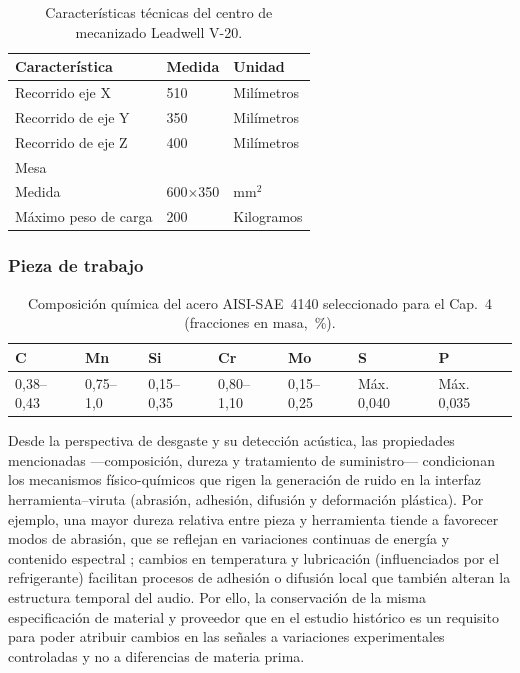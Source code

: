 \documentclass[12pt, letterpaper]{report}
\begin{document}
\begin{table}[htbp]
\centering
\small
\caption{Caracter\'{i}sticas t\'{e}cnicas del centro de mecanizado Leadwell V-20.}
\label{tab:leadwell-v20}
\begin{tabularx}{\textwidth}{X X X}
\toprule
Caracter\'{i}stica & Medida & Unidad \\
\midrule
Recorrido eje X & 510 & Mil\'{i}metros \\
Recorrido de eje Y & 350 & Mil\'{i}metros \\
Recorrido de eje Z & 400 & Mil\'{i}metros \\
Mesa &  &  \\
Medida & 600$\times$350 & mm$^2$ \\
M\'{a}ximo peso de carga & 200 & Kilogramos \\
\bottomrule
\end{tabularx}
\end{table}

\subsubsection{Pieza de trabajo}


\begin{table}[htbp]
\centering
\small
\caption{Composici\'{o}n qu\'{i}mica del acero AISI-SAE~4140 seleccionado para el Cap.~4 (fracciones en masa, \,\%).}
\label{tab:comp-4140-cap4}
\begin{tabularx}{\textwidth}{X X X X X X X}
\toprule
C & Mn & Si & Cr & Mo & S & P \\
\midrule
0{,}38--0{,}43 & 0{,}75--1{,}0 & 0{,}15--0{,}35 & 0{,}80--1{,}10 & 0{,}15--0{,}25 & M\'{a}x. 0{,}040 & M\'{a}x. 0{,}035 \\
\bottomrule
\end{tabularx}
\end{table}

Desde la perspectiva de desgaste y su detección acústica, las propiedades mencionadas ---composición, dureza y tratamiento de suministro--- condicionan los mecanismos físico-químicos que rigen la generación de ruido en la interfaz herramienta--viruta (abrasión, adhesión, difusión y deformación plástica). Por ejemplo, una mayor dureza relativa entre pieza y herramienta tiende a favorecer modos de abrasión, que se reflejan en variaciones continuas de energía y contenido espectral ; cambios en temperatura y lubricación (influenciados por el refrigerante) facilitan procesos de adhesión o difusión local que también alteran la estructura temporal del audio. Por ello, la conservación de la misma especificación de material y proveedor que en el estudio histórico es un requisito para poder atribuir cambios en las señales a variaciones experimentales controladas y no a diferencias de materia prima.
\end{document}
